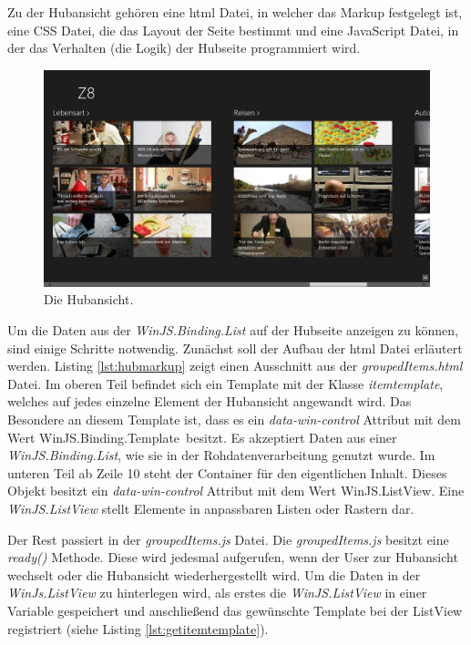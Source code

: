 \documentclass[12pt,a4paper,bibtotoc,abstracton]{scrartcl}
\begin{document}
Zu der Hubansicht gehören eine \ac{html} Datei, in welcher das Markup festgelegt ist, eine CSS Datei, die das Layout der Seite bestimmt und eine JavaScript Datei, in der das Verhalten (die Logik) der Hubseite programmiert wird. 

\begin{figure}[h]
	\centering
	\includegraphics[width=\textwidth]{Bilder/Screenshots/app/reise_aegypten_2gmit.png} 
	\caption{Die Hubansicht.}
	\label{fig:hubressortübersicht}
\end{figure}

Um die Daten aus der \textit{WinJS.Binding.List} auf der Hubseite anzeigen zu können, sind einige Schritte notwendig. Zunächst soll der Aufbau der \ac{html} Datei erläutert werden. Listing \ref{lst:hubmarkup} zeigt einen Ausschnitt aus der \textit{groupedItems.html} Datei. Im oberen Teil befindet sich ein Template mit der Klasse \textit{itemtemplate}, welches auf jedes einzelne Element der Hubansicht angewandt wird. Das Besondere an diesem Template ist, dass es ein \textit{data-win-control} Attribut mit dem Wert \glqq WinJS.Binding.Template\grqq\ besitzt. Es akzeptiert Daten aus einer \textit{WinJS.Binding.List}, wie sie in der Rohdatenverarbeitung genutzt wurde. Im unteren Teil ab Zeile 10 steht der Container für den eigentlichen Inhalt. Dieses Objekt besitzt ein \textit{data-win-control} Attribut mit dem Wert \glqq WinJS.ListView\grqq. Eine \textit{WinJS.ListView} stellt Elemente in anpassbaren Listen oder Rastern dar. 

\begin{minipage}{\linewidth}
  
\end{minipage}

Der Rest passiert in der \textit{groupedItems.js} Datei. Die \textit{groupedItems.js} besitzt eine \textit{ready()} Methode. Diese wird jedesmal aufgerufen, wenn der User zur Hubansicht wechselt oder die Hubansicht wiederhergestellt wird. Um die Daten in der \textit{WinJs.ListView} zu hinterlegen wird, als erstes die \textit{WinJS.ListView} in einer Variable gespeichert und anschließend das gewünschte Template bei der ListView registriert (siehe Listing \ref{lst:getitemtemplate}). 
\end{document}
